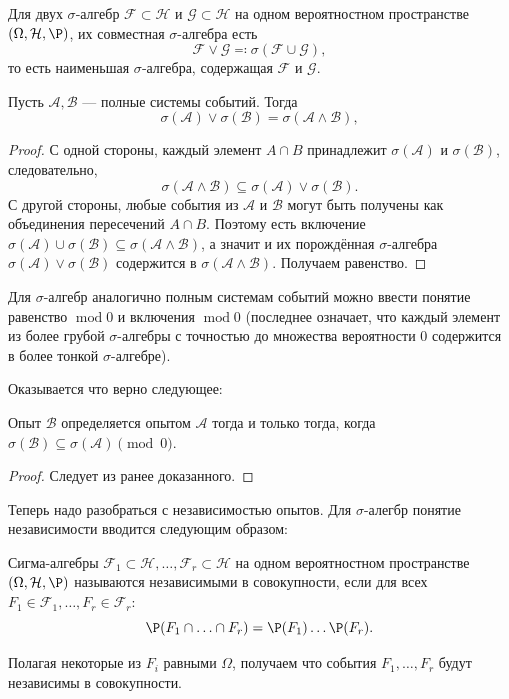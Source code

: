 \begin{definition*}
	Для двух $\sigma$‑алгебр \(\mathcal{F} \subset \mathcal{H}\) и \(\mathcal{G} \subset \mathcal{H}\) на одном вероятностном пространстве \((\Omega,\mathcal{H},\P)\),  их совместная $\sigma$-алгебра есть
    \[
        \mathcal{F}\lor\mathcal{G} \eqcolon \sigma(\mathcal{F}\cup\mathcal{G}),
    \]
	то есть наименьшая $\sigma$‑алгебра, содержащая $\mathcal{F}$ и $\mathcal{G}$.
\end{definition*}
\begin{proposition*}
    Пусть \(\mathcal{A},\mathcal{B}\) --- полные системы событий. Тогда
    \[
        \sigma(\mathcal{A}) \lor \sigma(\mathcal{B}) = \sigma(\mathcal{A}\land\mathcal{B}),
    \]
\end{proposition*}
\begin{proof}
    С одной стороны, каждый элемент \(A\cap B\) принадлежит \(\sigma(\mathcal{A})\) и \(\sigma(\mathcal{B})\), следовательно,
    \[
        \sigma(\mathcal{A}\land\mathcal{B})\subseteq \sigma(\mathcal{A})\lor\sigma(\mathcal{B}).
    \]
    С другой стороны, любые события из \(\mathcal{A}\) и \(\mathcal{B}\) могут быть получены как объединения пересечений \(A\cap B\). Поэтому есть включение \(\sigma(\mathcal{A})\cup\sigma(\mathcal{B})\subseteq\sigma(\mathcal{A}\land\mathcal{B})\), а значит и их порождённая $\sigma$-алгебра \(\sigma(\mathcal{A})\lor\sigma(\mathcal{B})\) содержится в \(\sigma(\mathcal{A}\land\mathcal{B})\). Получаем равенство.
\end{proof}

Для $\sigma$-алгебр аналогично полным системам событий можно ввести понятие равенство $\operatorname{mod} 0$ и включения $\operatorname{mod} 0$ (последнее означает, что каждый элемент из более грубой $\sigma$-алгебры с точностью до множества вероятности 0 содержится в более тонкой $\sigma$-алгебре).

Оказывается что верно следующее:
\begin{proposition*}
	Опыт $\mathcal{B}$ определяется опытом $\mathcal{A}$ тогда и только тогда, когда $\sigma(\mathcal{B}) \subseteq \sigma(\mathcal{A}) \pmod 0$.
\end{proposition*}
\begin{proof}
	Следует из ранее доказанного.
\end{proof}


Теперь надо разобраться с независимостью опытов. Для $\sigma$-алегбр понятие независимости вводится следующим образом:

\begin{definition*}
	Сигма‑алгебры \(\mathcal{F}_1 \subset \mathcal{H}, \ldots, \mathcal{F}_r \subset \mathcal{H}\)  на одном вероятностном пространстве \((\Omega,\mathcal{H},\P)\) называются независимыми в совокупности, если для всех \(F_1 \in\mathcal{F}_1, \ldots, F_r \in \mathcal{F}_r\):
    \[
        \P(F_1 \cap \ldots \cap F_r)=\P(F_1) \ldots \P(F_r).
    \]
\end{definition*}
\begin{remark}
	Полагая некоторые из $F_i$ равными $\Omega$, получаем что события $F_1, \ldots, F_r$ будут независимы в совокупности.
\end{remark}

